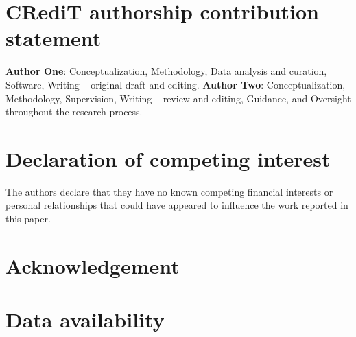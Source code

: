 \documentclass[3p]{elsarticle}
\begin{document}
\section*{CRediT authorship contribution statement}
\textbf{Author One}: Conceptualization, Methodology, Data analysis and curation,
Software, Writing -- original draft and editing.
\textbf{Author Two}: Conceptualization, Methodology, Supervision,
Writing -- review and editing, Guidance, and Oversight throughout the research process.

\section*{Declaration of competing interest}
The authors declare that they have no known competing financial interests or
personal relationships that could have appeared to influence the work reported
in this paper.

\section*{Acknowledgement}

\section*{Data availability}



\end{document}

